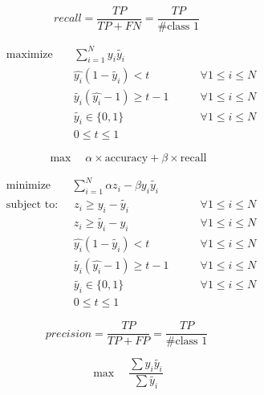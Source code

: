 \documentclass[a4paper]{article}
\begin{document}
\pagebreak

\[
recall = \frac{TP}{TP+FN} = \frac{TP}{\text{\# class 1}}
\]

\begin{equation}
\begin{aligned}
&\text{maximize} \quad \: \: \: \: \sum_{i=1}^{N} y_i \tilde{y_i} \\
& \qquad \qquad \qquad \hat{y_i} (1 - \tilde{y_i}) < t \qquad &\forall 1\le i \le N\\
& \qquad \qquad \qquad  \tilde{y_i} (\hat{y_i} - 1) \ge t - 1 \qquad &\forall 1\le i \le N\\
& \qquad \qquad \qquad \tilde{y_i} \in \{0, 1\} \qquad &\forall 1\le i \le N\\
& \qquad \qquad \qquad 0 \le t \le 1
\end{aligned}
\end{equation}

\pagebreak

\[
\max \quad \alpha \times \text{accuracy} + \beta \times \text{recall}
\]

\begin{equation}
\begin{aligned}
&\text{minimize} \quad \: \: \: \: \sum_{i=1}^{N} \alpha z_i - \beta y_i\tilde{y_i} \\
&\text{subject to:} \quad \: \: z_i \ge y_i - \tilde{y_i} \qquad &\forall 1\le i \le N\\
& \qquad \qquad \qquad z_i \ge \tilde{y_i}  - y_i \qquad &\forall 1\le i \le N\\
& \qquad \qquad \qquad \hat{y_i} (1 - \tilde{y_i}) < t \qquad &\forall 1\le i \le N\\
& \qquad \qquad \qquad  \tilde{y_i} (\hat{y_i} - 1) \ge t - 1 \qquad &\forall 1\le i \le N\\
& \qquad \qquad \qquad \tilde{y_i} \in \{0, 1\} \qquad &\forall 1\le i \le N\\
& \qquad \qquad \qquad 0 \le t \le 1
\end{aligned}
\end{equation}

\pagebreak

\[
precision = \frac{TP}{TP+FP} = \frac{TP}{\text{\# class 1}}
\]

\[
\max \quad \frac{\sum y_i\tilde{y_i}}{\sum \tilde{y_i}}
\]
\end{document}
